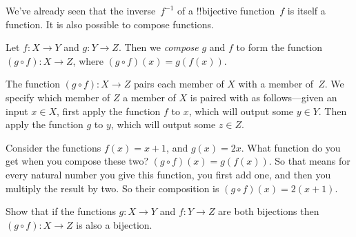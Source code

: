 \documentclass[../../../include/open-logic-section]{subfiles}
\begin{document}

\begin{explain}
We've already seen that the inverse~$f^{-1}$ of a !!{bijective}
function~$f$ is itself a function. It is also possible to compose
functions.
\end{explain}

\begin{defn}
 Let $f: X \rightarrow Y$ and $g: Y \rightarrow Z$. Then we
 \emph{compose} $g$ and $f$ to form the function $(g \circ f) \colon X
 \rightarrow Z$, where $(g \circ f)(x) = g(f(x))$.
\end{defn}

\begin{explain}
The function $(g \circ f) \colon X \rightarrow Z$ pairs each member of
$X$ with a member of~$Z$. We specify which member of $Z$ a member of
$X$ is paired with as follows---given an input $x \in X$, first apply
the function $f$ to $x$, which will output some $y \in Y$. Then apply
the function $g$ to $y$, which will output some $z \in Z$.
\end{explain}

\begin{ex}
Consider the functions $f(x) = x + 1$, and $g(x) = 2x$. What function
do you get when you compose these two? $(g \circ f)(x) = g(f(x))$. So
that means for every natural number you give this function, you first
add one, and then you multiply the result by two. So their composition
is $(g \circ f)(x) = 2(x+1)$.
\end{ex}

\begin{prob}
Show that if the functions $g \colon X \rightarrow Y$ and $f \colon Y
\rightarrow Z$ are both bijections then $(g \circ f) \colon X
\rightarrow Z$ is also a bijection.
\end{prob}
\end{document}
